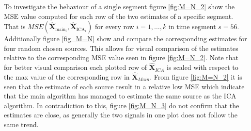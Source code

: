 To investigate the behaviour of a single segment figure \ref{fig:M=N_2} show the MSE value computed for each row of the two estimates of a specific segment. That is $MSE\left(\hat{\mathbf{X}}_{\text{main}_{i}},\hat{\mathbf{X}}_{\text{ICA}_{i}}\right)$ for every row $i = 1, \hdots, k$ in time segment $s=56$. Additionally figure \ref{fig_M=N} show and compare the corresponding estimates for four random chosen sources. This allows for visual comparison of the estimates relative to the corresponding MSE value seen in figure \ref{fig:M=N_2}. Note that for better visual comparison each plotted row of $\hat{\textbf{X}}_{ICA}$ is scaled with respect to the max value of the corresponding row in $\hat{\textbf{X}}_{Main}$.
From figure \ref{fig:M=N_2} it is seen that the estimate of each source result in a relative low MSE which indicate that the main algorithm has managed to estimate the same source as the ICA algorithm. In contradiction to this, figure \ref{fig:M=N_3} do not confirm that the estimates are close, as generally the two signals in one plot does not follow the same trend.   
